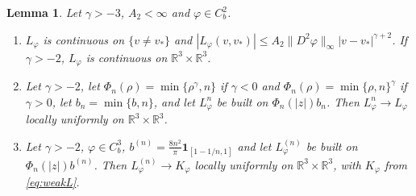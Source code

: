 \documentclass[11pt]{amsart}
\newtheorem{lemma}[theorem]{Lemma}
\theoremstyle{definition}
\newcommand{\RR}{\mathbb{R}}
\begin{document}
\begin{lemma}\label{lem:conv}
Let $\gamma>-3$, $A_2<\infty$ and $\varphi\in C^2_b$.
\begin{enumerate}
\item[(i)] $L_\varphi$ is continuous on $\{v\ne v_*\}$ and $|L_\varphi(v,v_*)|\le A_2\|D^2\varphi\|_\infty|v-v_*|^{\gamma+2}$. If $\gamma>-2$, $L_\varphi$ is continuous on $\RR^3\times\RR^3$.
\item[(ii)] Let $\gamma>-2$, let $\Phi_n(\rho)=\min\{\rho^\gamma,n\}$ if $\gamma<0$ and $\Phi_n(\rho)=\min\{\rho,n\}^\gamma$ if $\gamma>0$, let $b_n=\min\{b,n\}$, and let $L^n_\varphi$ be built on $\Phi_n(|z|)b_n$. Then $L^n_\varphi\to L_\varphi$ locally uniformly on $\RR^3\times\RR^3$.
\item[(iii)] Let $\gamma>-2$, $\varphi\in C^3_b$, $b^{(n)}=\frac{8n^2}\pi\mathbf 1_{[1-1/n,1]}$ and let $L^{(n)}_\varphi$ be built on $\Phi_n(|z|)b^{(n)}$. Then $L^{(n)}_\varphi\to K_\varphi$ locally uniformly on $\RR^3\times\RR^3$, with $K_\varphi$ from \eqref{eq:weakL}.
\end{enumerate}
\end{lemma}
\end{document}
